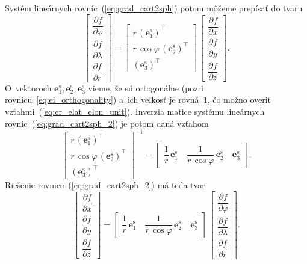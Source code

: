 \documentclass[a4paper, 12pt]{book}
\let\vec\mathbf
\begin{document}
%
Systém lineárnych rovníc~(\ref{eq:grad_cart2sph}) potom môžeme prepísať do 
tvaru
%
\begin{equation}
\label{eq:grad_cart2sph_2}
\begin{bmatrix}
\dfrac{\partial f}{\partial \varphi}\\[2ex]
\dfrac{\partial f}{\partial \lambda}\\[2ex]
\dfrac{\partial f}{\partial r}
\end{bmatrix}
%
=
%
\begin{bmatrix}
r \, \left( \vec e^\mathrm{s}_1\right)^\top\\
r \, \cos\varphi \, \left(\vec e^\mathrm{s}_2\right)^\top\\
\left(\vec e^\mathrm{s}_3\right)^\top
\end{bmatrix}
%
\,
%
\begin{bmatrix}
\dfrac{\partial f}{\partial x}\\[2ex]
\dfrac{\partial f}{\partial y}\\[2ex]
\dfrac{\partial f}{\partial z}
\end{bmatrix}
%
{.}
\end{equation}
%
O~vektoroch $\vec e^\mathrm{s}_1, \vec e^\mathrm{s}_2, \vec e^\mathrm{s}_3$ 
vieme, že sú ortogonálne (pozri rovnicu~\ref{eq:ei_orthogonality}) a~ich 
veľkosť je rovná~$1$, čo možno overiť vzťahmi~(\ref{eq:er_elat_elon_unit}).  
Inverzia matice systému lineárnych rovníc~(\ref{eq:grad_cart2sph_2}) je potom 
daná vzťahom \parencite{MichelLectures}
%
\begin{equation}
\begin{bmatrix}
r \, \left( \vec e^\mathrm{s}_1 \right)^\top\\[2ex]
r \, \cos\varphi \, \left( \vec e^\mathrm{s}_2 \right)^\top\\[2ex]
\left( \vec e^\mathrm{s}_3 \right)^\top
\end{bmatrix}^{-1}
%
=
%
\begin{bmatrix}
\dfrac{1}{r} \, \vec e^\mathrm{s}_1 \quad \dfrac{1}{r \, \cos\varphi} \, \vec 
e^\mathrm{s}_2 \quad \vec e^\mathrm{s}_3
\end{bmatrix}
{.}
\end{equation}
%
Riešenie rovnice~(\ref{eq:grad_cart2sph_2}) má teda tvar
%
\begin{equation}
\label{eq:grad_cart2sph_3}
\begin{bmatrix}
\dfrac{\partial f}{\partial x}\\[2ex]
\dfrac{\partial f}{\partial y}\\[2ex]
\dfrac{\partial f}{\partial z}
\end{bmatrix}
%
=
%
\begin{bmatrix}
\dfrac{1}{r} \, \vec e^\mathrm{s}_1 \quad \dfrac{1}{r \, \cos\varphi} \, \vec 
e^\mathrm{s}_2 \quad \vec e^\mathrm{s}_3
\end{bmatrix}
%
\,
%
\begin{bmatrix}
\dfrac{\partial f}{\partial \varphi}\\[2ex]
\dfrac{\partial f}{\partial \lambda}\\[2ex]
\dfrac{\partial f}{\partial r}
\end{bmatrix}
%
{.}
\end{equation}
\end{document}
